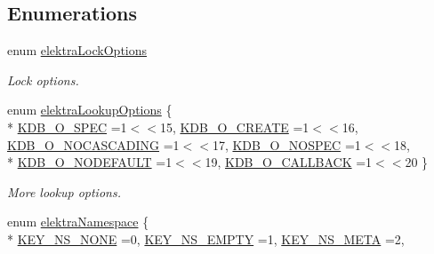 \subsection*{Enumerations}
\begin{DoxyCompactItemize}
\item 
\hypertarget{group__proposal_ga824e384e248ed1e05448294bff7271c0}{enum \hyperlink{group__proposal_ga824e384e248ed1e05448294bff7271c0}{elektra\+Lock\+Options} }\label{group__proposal_ga824e384e248ed1e05448294bff7271c0}

\begin{DoxyCompactList}\small\item\em Lock options. \end{DoxyCompactList}\item 
enum \hyperlink{group__proposal_ga93673533c4c8eb1fdfca76b98c5f49b0}{elektra\+Lookup\+Options} \{ \\*
\hyperlink{group__proposal_gga93673533c4c8eb1fdfca76b98c5f49b0a187bc7e52493fb8f1eb5693015478dae}{K\+D\+B\+\_\+\+O\+\_\+\+S\+P\+E\+C} =1$<$$<$15, 
\hyperlink{group__proposal_gga93673533c4c8eb1fdfca76b98c5f49b0a72155bedec545b2e96372ab28169620a}{K\+D\+B\+\_\+\+O\+\_\+\+C\+R\+E\+A\+T\+E} =1$<$$<$16, 
\hyperlink{group__proposal_gga93673533c4c8eb1fdfca76b98c5f49b0abc4c6e04823b6d684f4db8df3b84f326}{K\+D\+B\+\_\+\+O\+\_\+\+N\+O\+C\+A\+S\+C\+A\+D\+I\+N\+G} =1$<$$<$17, 
\hyperlink{group__proposal_gga93673533c4c8eb1fdfca76b98c5f49b0a420d8ea3671ffea4fe8400570cfe5c8d}{K\+D\+B\+\_\+\+O\+\_\+\+N\+O\+S\+P\+E\+C} =1$<$$<$18, 
\\*
\hyperlink{group__proposal_gga93673533c4c8eb1fdfca76b98c5f49b0abdcfd6d28200b5c650615fba430496bb}{K\+D\+B\+\_\+\+O\+\_\+\+N\+O\+D\+E\+F\+A\+U\+L\+T} =1$<$$<$19, 
\hyperlink{group__proposal_gga93673533c4c8eb1fdfca76b98c5f49b0a70ac5d04d6f855e17e4c33dfeeddd39e}{K\+D\+B\+\_\+\+O\+\_\+\+C\+A\+L\+L\+B\+A\+C\+K} =1$<$$<$20
 \}
\begin{DoxyCompactList}\small\item\em More lookup options. \end{DoxyCompactList}\item 
enum \hyperlink{group__proposal_gaec3b8d6f430ae49b91bafe8a86310a68}{elektra\+Namespace} \{ \\*
\hyperlink{group__proposal_ggaec3b8d6f430ae49b91bafe8a86310a68a3659698b0a07454ca8055ab693e8efd1}{K\+E\+Y\+\_\+\+N\+S\+\_\+\+N\+O\+N\+E} =0, 
\hyperlink{group__proposal_ggaec3b8d6f430ae49b91bafe8a86310a68a33d6c53529b4e6921d0b1d6565df2f1f}{K\+E\+Y\+\_\+\+N\+S\+\_\+\+E\+M\+P\+T\+Y} =1, 
\hyperlink{group__proposal_ggaec3b8d6f430ae49b91bafe8a86310a68ac5fbf2c3a7ae79fa2d60c48ae3e72688}{K\+E\+Y\+\_\+\+N\+S\+\_\+\+M\+E\+T\+A} =2, 

\end{DoxyCompactItemize}
